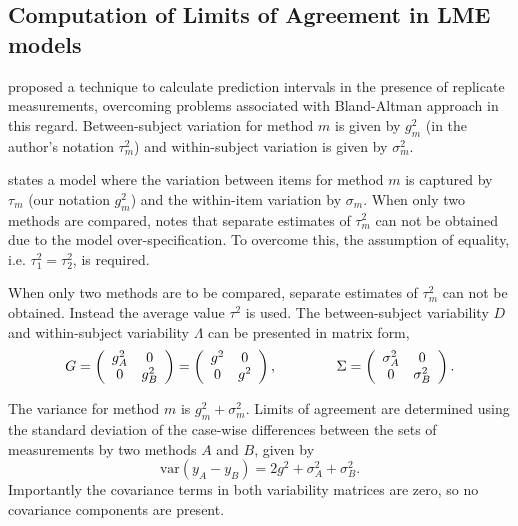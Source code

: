 \documentclass[12pt, a4paper]{report}
\theoremstyle{plain}
\theoremstyle{definition}
\theoremstyle{remark}
\begin{document}
	
	
	
	
	\subsection{Computation of Limits of Agreement in LME models}
	
	
	\citet{BXC2008} proposed a technique to calculate prediction intervals in the presence of replicate measurements, overcoming problems associated with Bland-Altman approach in this regard. Between-subject variation for method $m$ is given by $g^2_{m}$ (in the author's notation $\tau^2_m$) and within-subject variation is given by $\sigma^2_{m}$.  

	\citet{BXC2008} states a model where the variation between items for method $m$ is captured by $\tau_m$ (our notation $g^2_m$) and the within-item variation by $\sigma_m$. When only two methods are compared, \citet{BXC2008} notes that separate estimates of $\tau^2_m$ can not be obtained due to the model over-specification. To overcome this, the assumption of equality, i.e. $\tau^2_1 = \tau^2_2$, is required.
	
	When only two methods are to be compared, separate estimates of $\tau^2_m$ can not be obtained. Instead the average value $\tau^2$ is used. The between-subject variability ${D}$ and within-subject variability ${\Lambda}$ can be presented in matrix form,\[
	{G} = \left(%
	\begin{array}{cc}
	g^2_{A}& 0 \\
	0 & g^2_{B} \\
	\end{array}%
	\right)=\left(%
	\begin{array}{cc}
	g^2& 0 \\
	0 & g^2\\
	\end{array}%
	\right),
	\hspace{1.5cm}
	{\Sigma} = \left(%
	\begin{array}{cc}
	\sigma^2_{A}& 0 \\
	0 & \sigma^2_{B} \\
	\end{array}%
	\right).
	\]
	
	The variance for method $m$ is $g^2_{m}+\sigma^2_{m}$. Limits of agreement are determined using the standard deviation of the case-wise differences between the sets of measurements by two methods $A$ and $B$, given by
	\begin{equation}
	\mbox{var} (y_{A}-y_{B}) = 2g^2 + \sigma^2_{A}+ \sigma^2_{B}.
	\end{equation}
	Importantly the covariance terms in both variability matrices are zero, so no covariance components are present. 
	
\end{document}
